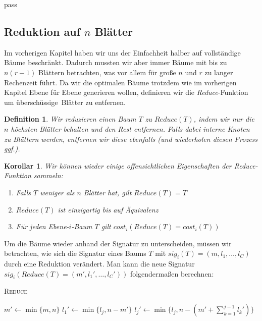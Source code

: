pass\documentclass[a4paper,10pt,ngerman]{scrartcl}
\newtheorem{definition}[satz]{Definition}
\newtheorem{korollar}[satz]{Korollar}
\begin{document}
    \subsection{Reduktion auf $n$ Blätter}
    Im vorherigen Kapitel haben wir uns der Einfachheit halber auf vollständige Bäume beschränkt.
    Dadurch mussten wir aber immer Bäume mit bis zu $n(r - 1)$ Blättern betrachten, was vor allem für große $n$ und $r$ zu langer Rechenzeit führt.
    Da wir die optimalen Bäume trotzdem wie im vorherigen Kapitel Ebene für Ebene generieren wollen, definieren wir die \textit{Reduce}-Funktion um \glqq überschüssige\grqq~Blätter zu entfernen.
    \begin{definition}
        Wir reduzieren einen Baum $T$ zu $Reduce(T)$, indem wir nur die $n$ höchsten Blätter behalten und den Rest entfernen.
        Falls dabei interne Knoten zu Blättern werden, entfernen wir diese ebenfalls (und wiederholen diesen Prozess ggf.).
    \end{definition}
    \begin{korollar}
        Wir können wieder einige offensichtlichen Eigenschaften der \textit{Reduce}-Funktion sammeln:
        \begin{enumerate}
            \item Falls $T$ weniger als $n$ Blätter hat, gilt $Reduce(T) = T$
            \item $Reduce(T)$ ist einzigartig bis auf Äquivalenz
            \item Für jeden Ebene-$i$-Baum $T$ gilt $cost_i(Reduce(T) = cost_i(T))$
        \end{enumerate}
    \end{korollar}
    Um die Bäume wieder anhand der Signatur zu unterscheiden, müssen wir betrachten, wie sich die Signatur eines Baums $T$ mit $sig_i(T) = (m, l_1, \dots, l_C)$ durch eine Reduktion verändert.
    Man kann die neue Signatur $sig_i(Reduce(T) = (m', l_1', \dots, l_C'))$ folgendermaßen berechnen: \\
    \begin{algorithm} [H]
        \caption{\textsc{Reduce}}
        \label{alg:reduce}
        \begin{algorithmic}[1]
            \State $m' \gets \min\{m, n\}$
            \State $l_1' \gets \min\{l_j, n - m'\}$
                \State $l_j' \gets \min\{l_j, n - (m' + \sum^{j-1}_{k=1}l_k')\}$
            \EndFor
        \end{algorithmic}
    \end{algorithm}
\end{document}
